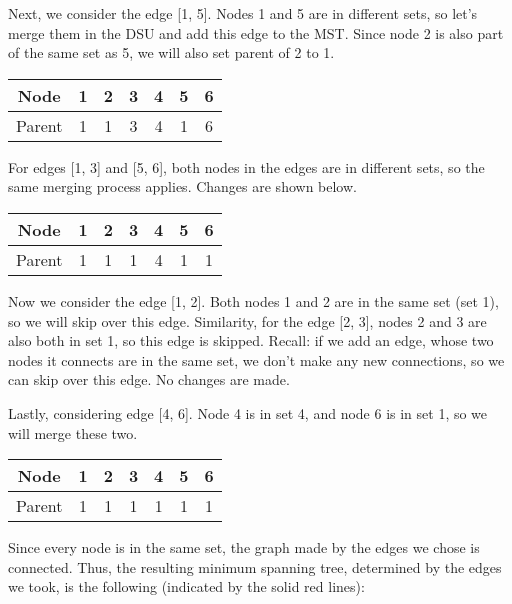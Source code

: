 \documentclass{article}
\begin{document}
Next, we consider the edge [1, 5]. Nodes 1 and 5 are in different sets, so let's merge them in the DSU and add this edge to the MST. Since node 2 is also part of the same set as 5, we will also set parent of 2 to 1.

\begin{center}
\begin{tabular}{|c|c|c|c|c|c|c|}
\hline
Node & 1 & \cellcolor[gray]{0.75}2 & 3 & 4 & \cellcolor[gray]{0.75}5 & 6\\
\hline
Parent & 1 & \cellcolor[gray]{0.75}1 & 3 & 4 & \cellcolor[gray]{0.75}1 & 6 \\
\hline
\end{tabular}
\end{center}

For edges [1, 3] and [5, 6], both nodes in the edges are in different sets, so the same merging process applies. Changes are shown below.

\begin{center}
\begin{tabular}{|c|c|c|c|c|c|c|}
\hline
Node & 1 & 2 & \cellcolor[gray]{0.75}3 & 4 & 5 & \cellcolor[gray]{0.75}6\\
\hline
Parent & 1 & 1 &\cellcolor[gray]{0.75}1 & 4 & 1 & \cellcolor[gray]{0.75}1 \\
\hline
\end{tabular}
\end{center}

Now we consider the edge [1, 2]. Both nodes 1 and 2 are in the same set (set 1), so we will skip over this edge. Similarity, for the edge [2, 3], nodes 2 and 3 are also both in set 1, so this edge is skipped. Recall: if we add an edge, whose two nodes it connects are in the same set, we don't make any new connections, so we can skip over this edge. No changes are made.

Lastly, considering edge [4, 6]. Node 4 is in set 4, and node 6 is in set 1, so we will merge these two.

\begin{center}
\begin{tabular}{|c|c|c|c|c|c|c|}
\hline
Node & 1 & 2 & 3 & \cellcolor[gray]{0.75}4 & 5 & 6\\
\hline
Parent & 1 & 1 & 1 & \cellcolor[gray]{0.75}1 & 1 & 1 \\
\hline
\end{tabular}
\end{center}
 
Since every node is in the same set, the graph made by the edges we chose is connected. Thus, the resulting minimum spanning tree, determined by the edges we took, is the following (indicated by the solid red lines):
\end{document}
